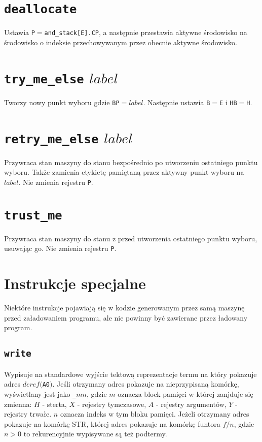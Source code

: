 \section{\texttt{deallocate}}

Ustawia \texttt{P}$ = $\texttt{and\_stack[E].CP}, a następnie przestawia aktywne środowisko na środowisko o indeksie przechowywanym przez obecnie aktywne środowisko.

\section{\texttt{try\_me\_else} $label$}

Tworzy nowy punkt wyboru gdzie \texttt{BP}$ = label$. Następnie ustawia \texttt{B}$ = $\texttt{E} i \texttt{HB}$ = $\texttt{H}.

\section{\texttt{retry\_me\_else} $label$}

Przywraca stan maszyny do stanu bezpośrednio po utworzeniu ostatniego punktu wyboru. Także zamienia etykietę pamiętaną przez aktywny punkt wyboru na $label$. Nie zmienia rejestru \texttt{P}.

\section{\texttt{trust\_me}}

Przywraca stan maszyny do stanu z przed utworzenia ostatniego punktu wyboru, usuwając go. Nie zmienia rejestru \texttt{P}.

\section{Instrukcje specjalne}

Niektóre instrukcje pojawiają się w kodzie generowanym przez samą maszynę przed załadowaniem programu, ale nie powinny być zawierane przez ładowany program.

\subsection{\texttt{write}}

Wypisuje na standardowe wyjście tektową reprezentacje termu na który pokazuje adres $deref($\texttt{A0}$)$. Jeśli otrzymany adres pokazuje na nieprzypisaną komórkę, wyświetlany jest jako \texttt{\_}$mn$, gdzie $m$ oznacza block pamięci w której zanjduje się zmienna: $H$ - sterta, $X$ - rejestry tymczasowe, $A$ - rejestry argumentów, $Y$ - rejestry trwałe. $n$ oznacza indeks w tym bloku pamięci. Jeżeli otrzymany adres pokazuje na komórkę STR, której adres pokazuje na komórkę funtora $f/n$, gdzie $n > 0$ to rekurencyjnie wypisywane są też podtermy.